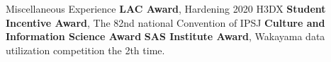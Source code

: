 \begin{rubric}{Miscellaneous Experience}
\entry*[Sep, 2020] \textbf{LAC Award}, Hardening 2020 H3DX
%
\entry*[March, 2020] \textbf{Student Incentive Award}, The 82nd national Convention of IPSJ
%
\entry*[Feb, 2020] \textbf{Culture and Information Science Award}
%
\entry*[2019] \textbf{SAS Institute Award}, Wakayama data utilization competition the 2th time.


\end{rubric}